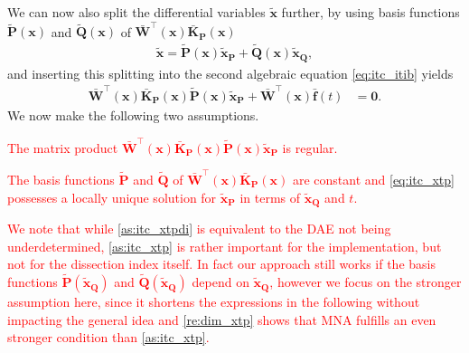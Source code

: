 \documentclass[AMA,STIX1COL]{WileyNJD-v2}
\newcommand{\mb}[1]{\mathbf{#1}}
\newcommand{\mbt}[1]{\tilde{\mathbf{#1}}}
\newcommand{\mbb}[1]{\bar{\mathbf{#1}}}
\newcommand{\T}{{\!\top}}
\begin{document}
We can now also split the differential variables $\mbt{x}$ further, by using basis functions $\mbt{P}(\mb{x})$ and $\mbt{Q}(\mb{x})$ of $\mbb{W}^\T (\mb{x}) \mbb{K}_\mb{P}(\mb{x})$
\begin{align}
    \mbt{x} = \mbt{P}(\mb{x}) \mbt{x}_\mb{P} +
    \mbt{Q}(\mb{x}) \mbt{x}_\mb{Q}, \label{eq:itc_xt}
\end{align}
and inserting this splitting into the second algebraic equation \eqref{eq:itc_itib} yields
\begin{align}
    \mbb{W}^\T (\mb{x}) \mbb{K}_\mb{P}(\mb{x}) \mbt{P}(\mb{x}) \mbt{x}_\mb{P} + \mbb{W}^\T (\mb{x}) \mbb{f}(t) &= \mb{0}. \label{eq:itc_xtp}
\end{align}
We now make the following two assumptions.
\textcolor{red}{\begin{assumption}
    \label{as:itc_xtpdi}
    The matrix product $\mbb{W}^\T (\mb{x}) \mbb{K}_\mb{P}(\mb{x}) \mbt{P}(\mb{x}) \mbt{x}_\mb{P}$ is regular.
\end{assumption}
\begin{assumption}
    \label{as:itc_xtp}
    The basis functions $\mbt{P}$ and $\mbt{Q}$ of $\mbb{W}^\T (\mb{x}) \mbb{K}_\mb{P}(\mb{x})$ are constant and \eqref{eq:itc_xtp} possesses a locally unique solution for $\mbt{x}_\mb{P}$ in terms of $\mbt{x}_\mb{Q}$ and $t$.
\end{assumption}
We note that while \autoref{as:itc_xtpdi} is equivalent to the DAE not being underdetermined\cite{jansen2014}, \autoref{as:itc_xtp} is rather important for the implementation, but not for the dissection index itself. In fact our approach still works if the basis functions $\mbt{P}(\mbt{x}_\mb{Q})$ and $\mbt{Q}(\mbt{x}_\mb{Q})$ depend on $\mbt{x}_\mb{Q}$, however we focus on the stronger assumption here, since it shortens the expressions in the following without impacting the general idea and \autoref{re:dim_xtp} shows that MNA fulfills an even stronger condition than \autoref{as:itc_xtp}.}
\end{document}
